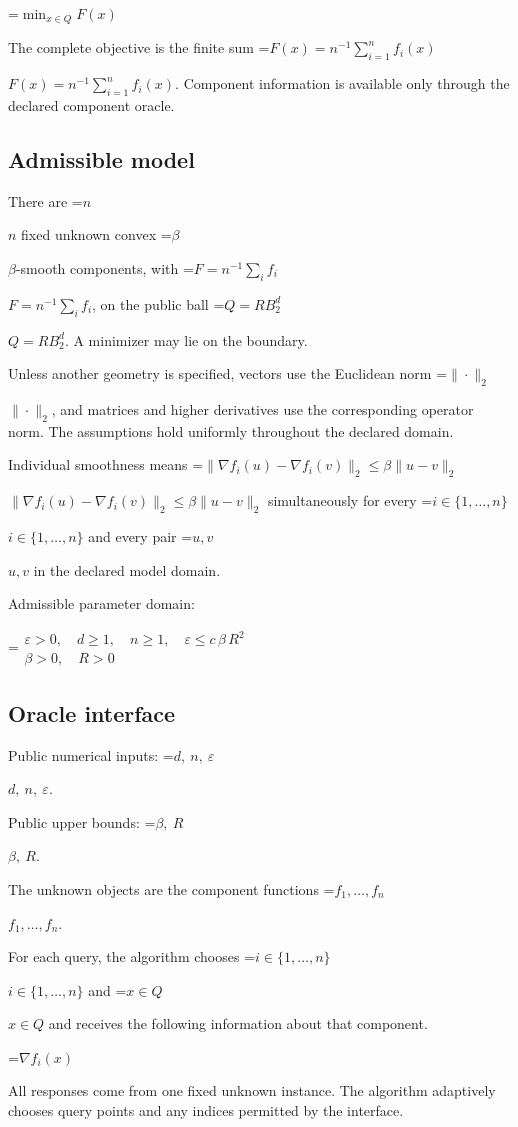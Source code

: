 \documentclass[10pt,a4paper]{article}
\newcommand{\AtlasMath}[1]{\par\begingroup\centering\setbox0=\hbox{$\displaystyle #1$}\ifdim\wd0>1.4\linewidth\typeout{ATLAS WIDE FORMULA: \the\wd0}\fi\ifdim\wd0>\linewidth\resizebox{\linewidth}{!}{\box0}\else\box0\fi\par\endgroup}
\newcommand{\AtlasInlineMath}[1]{\begingroup\setbox0=\hbox{$#1$}\ifdim\wd0>.4\linewidth\endgroup\AtlasMath{#1}\else\endgroup$#1$\fi}
\begin{document}
\AtlasMath{\min_{x\in Q}F(x)}


The complete objective is the finite sum \AtlasInlineMath{F(x)=n^{-1}\sum_{i=1}^n f_i(x)}. Component information is available only through the declared component oracle.

\subsection{Admissible model}
There are \AtlasInlineMath{n} fixed unknown convex \AtlasInlineMath{\beta}-smooth components, with \AtlasInlineMath{F=n^{-1}\sum_i f_i}, on the public ball \AtlasInlineMath{Q=RB_2^d}. A minimizer may lie on the boundary.

Unless another geometry is specified, vectors use the Euclidean norm \AtlasInlineMath{\|\cdot\|_2}, and matrices and higher derivatives use the corresponding operator norm. The assumptions hold uniformly throughout the declared domain.

Individual smoothness means \AtlasInlineMath{\|\nabla f_i(u)-\nabla f_i(v)\|_2\le\beta\|u-v\|_2} simultaneously for every \AtlasInlineMath{i\in\{1,\ldots,n\}} and every pair \AtlasInlineMath{u,v} in the declared model domain.

Admissible parameter domain:


\AtlasMath{\begin{gathered}\varepsilon > 0,\quad d \ge 1,\quad n \ge 1,\quad \varepsilon \le c\,\beta\,{R}^{2}\\\beta > 0,\quad R > 0\end{gathered}}


\subsection{Oracle interface}
Public numerical inputs: \AtlasInlineMath{d,\ n,\ \varepsilon}.

Public upper bounds: \AtlasInlineMath{\beta,\ R}.

The unknown objects are the component functions \AtlasInlineMath{f_1,\ldots,f_n}.

For each query, the algorithm chooses \AtlasInlineMath{i\in\{1,\ldots,n\}} and \AtlasInlineMath{x\in Q} and receives the following information about that component.


\AtlasMath{\nabla f_i(x)}


All responses come from one fixed unknown instance. The algorithm adaptively chooses query points and any indices permitted by the interface.
\end{document}
